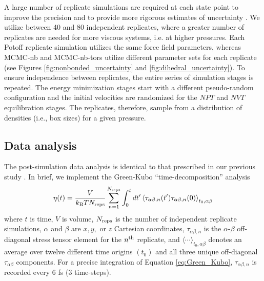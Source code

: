 \documentclass[preprint,review,12pt]{elsarticle}
\begin{document}
	A large number of replicate simulations are required at each state point to improve the precision and to provide more rigorous estimates of uncertainty \cite{Maginn2018,Zhang2015}. We utilize between 40 and 80 independent replicates, where a greater number of replicates are needed for more viscous systems, i.e. at higher pressures. Each Potoff replicate simulation utilizes the same force field parameters, whereas MCMC-nb and MCMC-nb-tors utilize different parameter sets for each replicate (see Figures \ref{fig:nonbonded_uncertainty} and \ref{fig:dihedral_uncertainty}). To ensure independence between replicates, the entire series of simulation stages is repeated. The energy minimization stages start with a different pseudo-random configuration and the initial velocities are randomized for the $NPT$ and $NVT$ equilibration stages. The replicates, therefore, sample from a distribution of densities (i.e., box sizes) for a given pressure. 
	
	
	
	\subsection{Data analysis}
	
	The post-simulation data analysis is identical to that prescribed in our previous study \cite{Postdoc_3}. In brief, we implement the Green-Kubo ``time-decomposition'' analysis \cite{Maginn2018,Zhang2015}
	\begin{equation} \label{eq:Green_Kubo}
	\eta(t) = \frac{V}{k_{\rm B} T N_{\rm reps}} \sum_{n=1}^{N_{\rm reps}} \int_{0}^{t}dt'\left\langle \tau_{\alpha\beta,n}(t') \tau_{\alpha\beta,n}(0)\right\rangle_{t_0,\alpha\beta}
	\end{equation} 
	where $t$ is time, $V$ is volume, $N_{\rm reps}$ is the number of independent replicate simulations, $\alpha$ and $\beta$ are $x, y, $ or $z$ Cartesian coordinates, $\tau_{\alpha\beta,n}$ is the $\alpha$-$\beta$ off-diagonal stress tensor element for the $n^{\rm th}$ replicate, and $\langle \cdots \rangle_{t_0,\alpha\beta}$ denotes an average over twelve different time origins $(t_0)$ and all three unique off-diagonal $\tau_{\alpha\beta}$ components. For a precise integration of Equation \ref{eq:Green_Kubo}, $\tau_{\alpha\beta,n}$ is recorded every 6 fs (3 time-steps). 
	
\end{document}
